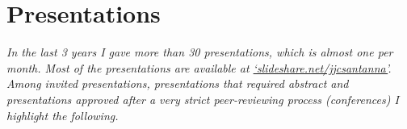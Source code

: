 \documentclass[print]{styles/friggeri-cv-mac} %
\begin{document}
%
%




\section{Presentations}\vspace{-5pt}

\textit{In the last 3 years I gave more than 30 presentations, which is almost
one per month. Most of the presentations are available at
\href{http://www.slideshare.net/jjcsantanna}{`slideshare.net/jjcsantanna'}.
Among invited presentations, presentations that required abstract and 
presentations approved after a very strict peer-reviewing process (conferences)
I highlight the following.}
\end{document}
